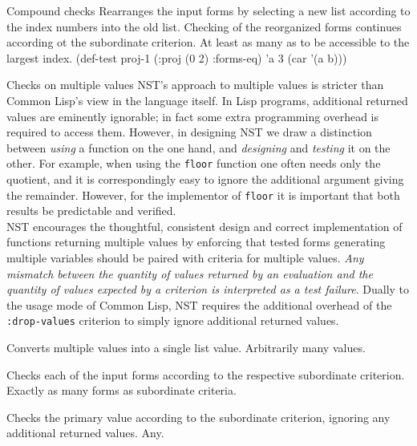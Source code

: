 \begin{criteriaGroup}{Compound checks}{}
{Rearranges the input forms by selecting a new list according to the
index numbers into the old list.  Checking of the reorganized forms
continues according ot the subordinate criterion.}
{At least as many as to be accessible to the largest
index.}
{}
{\singleEx}
{(def-test proj-1 (:proj (0 2) :forms-eq) 'a 3 (car '(a b)))}

\end{criteriaGroup}

\begin{criteriaGroup}{Checks on multiple values}{
NST's approach to multiple values is stricter than Common Lisp's view
in the language itself.  In Lisp programs, additional returned values
are eminently ignorable; in fact some extra programming overhead is
required to access them.  However, in designing NST we draw a
distinction between \emph{using} a function on the one hand, and
\emph{designing} and \emph{testing} it on the other.  For example,
when using the \texttt{floor} function one often needs only the
quotient, and it is correspondingly easy to ignore the additional
argument giving the remainder.  However, for the implementor of
\texttt{floor} it is important that both results be predictable and
verified.\vspace{\parskip}\\\hspace*{\parindent}NST encourages the
thoughtful, consistent design and correct implementation of functions
returning multiple values by enforcing that tested forms generating
multiple variables should be paired with criteria for multiple values.
\emph{Any mismatch between the quantity of values returned by an
  evaluation and the quantity of values expected by a criterion is
  interpreted as a test failure}.  Dually to the usage mode of Common
Lisp, NST requires the additional overhead of the
\texttt{:drop-values} criterion to simply ignore additional returned
values.}

{Converts multiple values into a single list value.}
{Arbitrarily many values.}
{\noExpl}{\noEx}{}

{Checks each of the input forms according to the respective
subordinate criterion.}
{Exactly as many forms as subordinate criteria.}
{\noExpl}{\noEx}{}

{Checks the primary value according to the subordinate criterion,
ignoring any additional returned values.}
{Any.}
{\noExpl}{\noEx}{}

\end{criteriaGroup}

